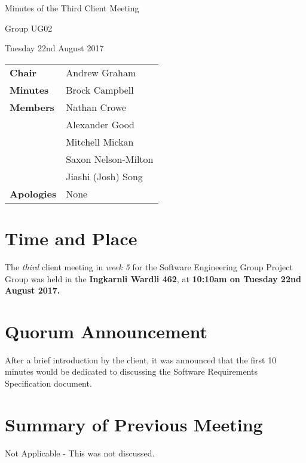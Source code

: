 \documentclass{article}
\begin{document}
\begin{center}    
{\huge Minutes of the Third Client Meeting \par}
\vspace{0.5cm}
{\large Group UG02 \par}
\vspace{0.5cm}
{\large Tuesday 22nd August 2017 \par}
\vspace{0.5cm}
\end{center}

\begin{flushleft}
\begin{tabular}{ll}
{\bfseries Chair} & Andrew Graham \\
{\bfseries Minutes} & Brock Campbell \\
{\bfseries Members} & Nathan Crowe \\
 & Alexander Good \\
 & Mitchell Mickan \\
 & Saxon Nelson-Milton \\
 & Jiashi (Josh) Song \\
{\bfseries Apologies} & None\\
\end{tabular}
\end{flushleft}

\section{Time and Place}
The {\itshape third} client meeting in {\itshape week 5} for the Software Engineering Group Project Group was held in the {\bfseries Ingkarnli Wardli 462}, at {\bfseries 10:10am on Tuesday 22nd August 2017.} 

\section{Quorum Announcement}
    After a brief introduction by the client, it was announced that the first 10 minutes would be dedicated to discussing the Software Requirements Specification document.
    
\section{Summary of Previous Meeting}
    Not Applicable - This was not discussed.
    
\end{document}
